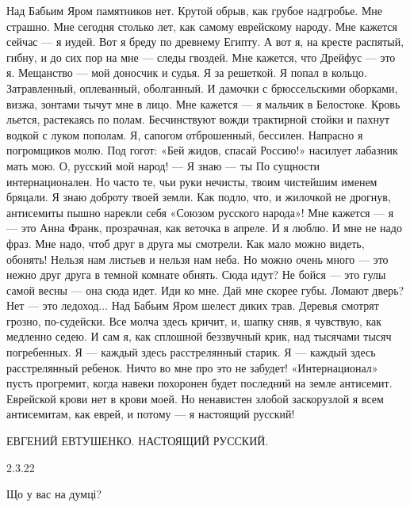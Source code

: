 \raggedcolumns
\begin{multicols}{2} %
\setlength{\parindent}{0pt}

\obeycr
Над Бабьим Яром памятников нет.
Крутой обрыв, как грубое надгробье.
Мне страшно.
Мне сегодня столько лет,
как самому еврейскому народу.
\smallskip
Мне кажется сейчас —
я иудей.
Вот я бреду по древнему Египту.
А вот я, на кресте распятый, гибну,
и до сих пор на мне — следы гвоздей.
\smallskip
Мне кажется, что Дрейфус —
это я.
Мещанство —
мой доносчик и судья.
\smallskip
Я за решеткой.
Я попал в кольцо.
Затравленный,
оплеванный,
оболганный.
\smallskip
И дамочки с брюссельскими оборками,
визжа, зонтами тычут мне в лицо.
Мне кажется —
я мальчик в Белостоке.
Кровь льется, растекаясь по полам.
\smallskip
Бесчинствуют вожди трактирной стойки
и пахнут водкой с луком пополам.
Я, сапогом отброшенный, бессилен.
Напрасно я погромщиков молю.
\smallskip
Под гогот:
«Бей жидов, спасай Россию!»\textendash
насилует лабазник мать мою.
\smallskip
О, русский мой народ! —
Я знаю —
ты
По сущности интернационален.
\smallskip
Но часто те, чьи руки нечисты,
твоим чистейшим именем бряцали.
Я знаю доброту твоей земли.
\smallskip
Как подло,
что, и жилочкой не дрогнув,
антисемиты пышно нарекли
себя «Союзом русского народа»!
\smallskip
Мне кажется —
я — это Анна Франк,
прозрачная,
как веточка в апреле.
\smallskip
И я люблю.
И мне не надо фраз.
Мне надо,
чтоб друг в друга мы смотрели.
\smallskip
Как мало можно видеть,
обонять!
Нельзя нам листьев
и нельзя нам неба.
\smallskip
Но можно очень много —
это нежно
друг друга в темной комнате обнять.
Сюда идут?
\smallskip
Не бойся — это гулы
самой весны —
она сюда идет.
Иди ко мне.
\smallskip
Дай мне скорее губы.
Ломают дверь?
Нет — это ледоход...
Над Бабьим Яром шелест диких трав.
\smallskip
Деревья смотрят грозно,
по-судейски.
Все молча здесь кричит,
и, шапку сняв,
я чувствую,
как медленно седею.
\smallskip
И сам я,
как сплошной беззвучный крик,
над тысячами тысяч погребенных.
\smallskip
Я —
каждый здесь расстрелянный старик.
\smallskip
Я —
каждый здесь расстрелянный ребенок.
\smallskip
Ничто во мне
про это не забудет!
\smallskip
«Интернационал»
пусть прогремит,
когда навеки похоронен будет
последний на земле антисемит.
Еврейской крови нет в крови моей.
Но ненавистен злобой заскорузлой
я всем антисемитам,
как еврей,
и потому —
я настоящий русский!
\restorecr
\end{multicols} %

ЕВГЕНИЙ ЕВТУШЕНКО. НАСТОЯЩИЙ РУССКИЙ.

2.3.22

Що у вас на думці?

